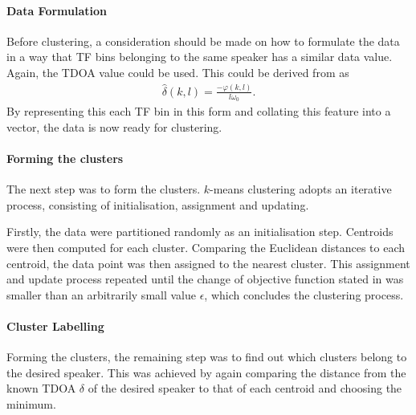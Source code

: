 \documentclass[a4paper,twoside,12pt,hidelinks]{article}
\begin{document}
\paragraph{Data Formulation}
Before clustering, a consideration should be made on how to formulate the data in a way that TF bins belonging to the same speaker has a similar data value. Again, the TDOA value could be used. This could be derived from  as 
\begin{align}
\hat{\delta}(k,l)=\frac{-\varphi(k,l)}{l\omega_0}.
\end{align}
By representing this each TF bin in this form and collating this feature into a vector, the data is now ready for clustering. 

\paragraph{Forming the clusters}
The next step was to form the clusters. $k$-means clustering adopts an iterative process, consisting of initialisation, assignment and updating.

Firstly, the data were partitioned randomly as an initialisation step. Centroids were then computed for each cluster. Comparing the Euclidean distances to each centroid, the data point was then assigned to the nearest cluster. This assignment and update process repeated until the change of objective function stated in  was smaller than an arbitrarily small value $\epsilon$, which concludes the clustering process.

\paragraph{Cluster Labelling}
Forming the clusters, the remaining step was to find out which clusters belong to the desired speaker. This was achieved by again comparing the distance from the known TDOA $\delta$ of the desired speaker to that of each centroid and choosing the minimum. 
\end{document}
